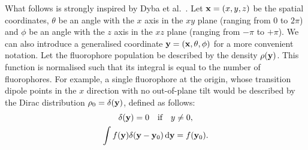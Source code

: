 What follows is strongly inspired by Dyba et al.~\cite{Dyba2005}. Let $ \vb{x} = (x, y, z)$ be the spatial coordinates, $ \theta $ be an angle with the $ x $ axis in the $ xy $ plane (ranging from $ 0 $ to $ 2\pi$) and $ \phi $ be an angle with the $ z $ axis in the $ xz $ plane (ranging from $ -\pi$ to $+\pi$). We can also introduce a generalised coordinate $ \vb{y} = (\vb{x}, \theta, \phi) $ for a more convenient notation.
Let the fluorophore population be described by the density $ \rho(\vb{y}) $. This function is normalised such that its integral is equal to the number of fluorophores. For example, a single fluorophore at the origin, whose transition dipole points in the $ x $ direction with no out-of-plane tilt would be described by the Dirac distribution $ \rho_0 = \delta(\vb{y}) $, defined as follows:
\begin{gather}
	\delta(\vb{y}) = 0 \qq{if} y\neq0, \\
	\int f(\vb{y})\delta(\vb{y}-\vb{y}_0) \dd{\vb{y}} = f(\vb{y}_0).
\end{gather}

